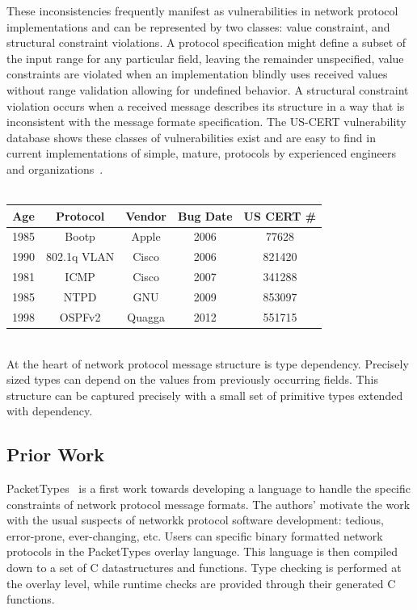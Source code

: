 These inconsistencies frequently manifest as vulnerabilities in network protocol
implementations and can be represented by two classes: value constraint, and 
structural constraint violations. A protocol specification might define a subset
of the input range for any particular field, leaving the remainder unspecified,
value constraints are violated when an implementation blindly uses received
values without range validation allowing for undefined behavior. A structural 
constraint violation occurs when a received message describes its structure in
a way that is inconsistent with the message formate specification.
The US-CERT vulnerability database shows these classes of vulnerabilities exist
and are easy to find in current implementations of simple, mature, protocols by
experienced engineers and organizations~\cite{us_cert}. \\
\\
\begin{tabular}{|c|c|c|c|c|}
   \hline
   Age & Protocol & Vendor & Bug Date & US CERT \# \\ \hline
   \hline
   1985 & Bootp & Apple & 2006 & 77628 \\ \hline
   1990 & 802.1q VLAN & Cisco & 2006 & 821420 \\ \hline
   1981 & ICMP & Cisco & 2007 & 341288 \\ \hline
   1985 & NTPD & GNU & 2009 & 853097 \\ \hline
   1998 & OSPFv2 & Quagga & 2012 & 551715 \\ \hline
\end{tabular} \\

At the heart of network protocol message structure is type dependency. Precisely
sized types can depend on the values from previously occurring fields. This 
structure can be captured precisely with a small set of primitive types extended
with dependency.

\subsection{Prior Work}

PacketTypes~\cite{packet_types} is a first work towards developing a
language to handle the specific constraints of network protocol
message formats. The authors' motivate the work with the usual suspects
of networkk protocol software development: tedious, error-prone, ever-changing,
etc. Users can specific binary formatted network protocols in the PacketTypes
overlay language. This language is then compiled down to a set of C
datastructures and functions. Type checking is performed at the overlay level,
while runtime checks are provided through their generated C functions.

